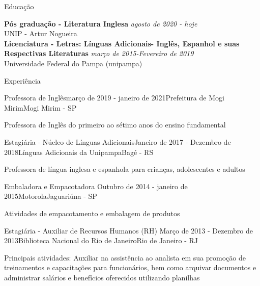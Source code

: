 \documentclass{resume} %
\begin{document}

\begin{rSection}{Educação}

{\bf Pós graduação - Literatura Inglesa} \hfill {\em agosto de 2020 - hoje} \\ 
UNIP - Artur Nogueira \\

{\bf Licenciatura - Letras: Línguas Adicionais- Inglês, Espanhol e suas Respectivas
Literaturas} \hfill {\em março de 2015-Fevereiro de 2019} \\ 
Universidade Federal do Pampa (unipampa) \\


\end{rSection}


\begin{rSection}{Experiência}

\begin{rSubsection}{Professora de Inglês}{março de 2019 - janeiro de 2021}{Prefeitura de Mogi Mirim}{Mogi Mirim - SP}
\item Professora de Inglês do primeiro ao sétimo anos do ensino fundamental
\end{rSubsection}


\begin{rSubsection}{Estagiária - Núcleo de Línguas Adicionais}{Janeiro de 2017 - Dezembro de 2018}{Línguas Adicionais da Unipampa}{Bagé - RS}
\item Professora de língua inglesa e espanhola para crianças, adolescentes e adultos
\end{rSubsection}


\begin{rSubsection}{Embaladora e Empacotadora
}{Outubro de 2014 - janeiro de 2015}{Motorola}{Jaguariúna - SP}
\item Atividades de empacotamento e embalagem de produtos
\end{rSubsection}

\begin{rSubsection}{Estagiária - Auxiliar de Recursos Humanos (RH)
}{Março de 2013 - Dezembro de 2013}{Biblioteca Nacional do Rio de Janeiro}{Rio de Janeiro - RJ }
\item Principais atividades: Auxiliar na assistência ao analista em sua promoção de treinamentos e
capacitações para funcionários, bem como arquivar documentos e administrar salários e benefícios
oferecidos utilizando planilhas
\end{rSubsection}

\end{rSection}
\end{document}
